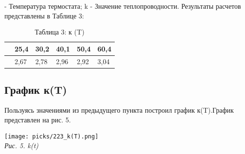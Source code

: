 \noindent{} - Температура термостата; k - Значение теплопроводности. Результаты расчетов представлены в Таблице 3:

\begin{table}[h!]
    \begin{center}
        \caption*{\color[HTML]{000000}Таблица 3: к (T)}
        \begin{tabular}{|P{3cm}|P{1.3cm}|P{1.3cm}|P{1.3cm}|P{1.3cm}|P{1.3cm}|}
        \hline

                		         & 25,4  & 30,2  & 40,1  & 50,4  & 60,4 \\  
            \hline
             & 2,67 & 2,78 & 2,96 & 2,92 & 3,04 \\

        \hline    		
        \end{tabular}
    \end{center}
\end{table}

\subsection{График к(T)}

Пользуясь значениями из предыдущего пункта построил график к(T).\linebreak График представлен на рис. 5. \\

\begin{center}
    \texttt{[image: picks/223\_k(T).png]} \\
    \textit{\textcolor[HTML]{000000}{Рис. 5. k(t)}}
\end{center} 